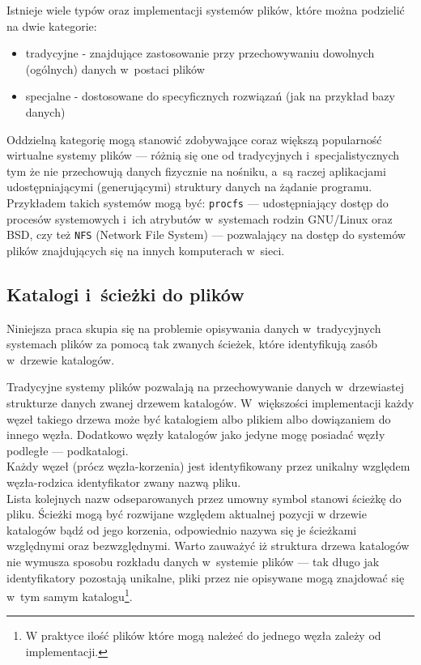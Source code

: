 \par
Istnieje wiele typów oraz implementacji systemów plików, które można podzielić na dwie kategorie:

\begin{itemize}
\item tradycyjne - znajdujące zastosowanie przy przechowywaniu dowolnych (ogólnych) danych w~postaci plików
\item specjalne - dostosowane do specyficznych rozwiązań (jak na przykład bazy danych)
\end{itemize}

Oddzielną kategorię mogą stanowić zdobywające coraz większą popularność wirtualne systemy plików --- różnią się one od tradycyjnych i~specjalistycznych tym że nie przechowują danych fizycznie na nośniku, a~są raczej aplikacjami udostępniającymi (generującymi) struktury danych na żądanie programu. Przykładem takich systemów mogą być: \texttt{procfs} --- udostępniający dostęp do procesów systemowych i~ich atrybutów w~systemach rodzin GNU/Linux oraz BSD, czy też \texttt{NFS} (Network File System) --- pozwalający na dostęp do systemów plików znajdujących się na innych komputerach w~sieci\cite{website:filesystems-howto}.

\subsection{Katalogi i~ścieżki do plików}
\par
Niniejsza praca skupia się na problemie opisywania danych w~tradycyjnych systemach plików za pomocą tak zwanych ścieżek, które identyfikują zasób w~drzewie katalogów\cite{wiki:path}.

\par
Tradycyjne systemy plików pozwalają na przechowywanie danych w~drzewiastej strukturze danych zwanej drzewem katalogów. W~większości implementacji każdy węzeł takiego drzewa może być katalogiem albo plikiem albo dowiązaniem do innego węzła. Dodatkowo węzły katalogów jako jedyne mogę posiadać węzły podległe --- podkatalogi\cite{website:filesystems-howto}.\\
Każdy węzeł (prócz węzła-korzenia) jest identyfikowany przez unikalny względem węzła-rodzica identyfikator zwany nazwą pliku.\\
Lista kolejnych nazw odseparowanych przez umowny symbol stanowi ścieżkę do pliku.
Ścieżki mogą być rozwijane względem aktualnej pozycji w drzewie katalogów bądź od jego korzenia, odpowiednio nazywa się je ścieżkami względnymi oraz bezwzględnymi.
Warto zauważyć iż struktura drzewa katalogów nie wymusza sposobu rozkładu danych w~systemie plików --- tak długo jak identyfikatory pozostają unikalne, pliki przez nie opisywane mogą znajdować się w~tym samym katalogu\footnote{W praktyce ilość plików które mogą należeć do jednego węzła zależy od implementacji.}.

